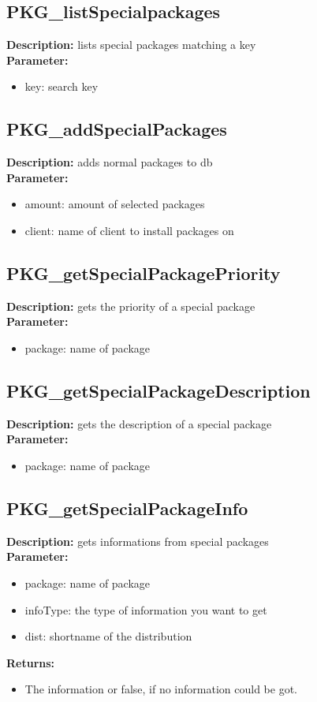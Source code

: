 \subsection{PKG\_listSpecialpackages}
\textbf{Description:} lists special packages matching a key\\
\textbf{Parameter:}
\begin{itemize}
\item key: search key
\end{itemize}

\subsection{PKG\_addSpecialPackages}
\textbf{Description:} adds normal packages to db\\
\textbf{Parameter:}
\begin{itemize}
\item amount: amount of selected packages
\item client: name of client to install packages on
\end{itemize}

\subsection{PKG\_getSpecialPackagePriority}
\textbf{Description:} gets the priority of a special package\\
\textbf{Parameter:}
\begin{itemize}
\item package: name of package
\end{itemize}

\subsection{PKG\_getSpecialPackageDescription}
\textbf{Description:} gets the description of a special package\\
\textbf{Parameter:}
\begin{itemize}
\item package: name of package
\end{itemize}

\subsection{PKG\_getSpecialPackageInfo}
\textbf{Description:} gets informations from special packages\\
\textbf{Parameter:}
\begin{itemize}
\item package: name of package
\item infoType: the type of information you want to get
\item dist: shortname of the distribution
\end{itemize}
\textbf{Returns:}
\begin{itemize}
\item The information or false, if no information could be got.
\end{itemize}

